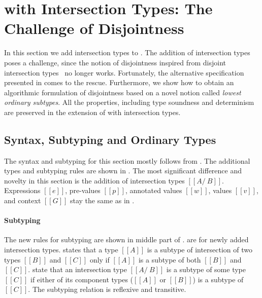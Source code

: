 \section{\cal with Intersection Types: The Challenge of Disjointness}
\label{sec:inter}

In this section we add intersection types to \cal.
The addition of intersection types poses a challenge,
since the notion of disjointness inspired from disjoint intersection types~\citep{oliveira2016disjoint}
no longer works. Fortunately, the alternative specification presented in
 comes to the rescue. Furthermore, we show how to obtain
an algorithmic formulation of disjointness based on a novel notion
called \emph{lowest ordinary subtypes}. All the properties, including
type soundness and determinism are preserved in the extension of \cal
with intersection types.

\subsection{Syntax, Subtyping and Ordinary Types}
\label{sec:inter:system}
The syntax and subtyping for this section mostly follows
from .  The additional types and subtyping rules are shown in
.
The most significant difference and novelty in this section
is the addition of intersection types $[[A/\ B]]$.
Expressions $[[e]]$, pre-values $[[p]]$, annotated values $[[w]]$,
values $[[v]]$, and context $[[G]]$ stay the same as in .

\paragraph{Subtyping}
The new rules for subtyping are shown in middle part of
.   are for newly
added intersection types.  states that a type $[[A]]$ is
a subtype of intersection of two types $[[B]]$ and $[[C]]$ only if
$[[A]]$ is a subtype of both $[[B]]$ and $[[C]]$.  
state that an intersection type $[[A /\ B]]$ is a subtype
of some type $[[C]]$ if either of its component types ($[[A]]$ or
$[[B]]$) is a subtype of $[[C]]$. The subtyping relation is reflexive
and transitive.

